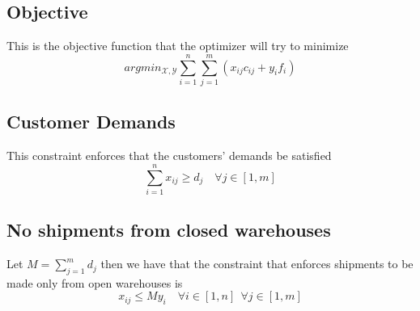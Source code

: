 \documentclass{assignment}
\begin{document}
\subsection{Objective}
This is the objective function that the optimizer will try to minimize
$$ argmin_{\mathcal{X},\mathcal{Y}} \sum_{i=1}^n \sum_{j=1}^m \left( x_{ij}c_{ij} + y_if_i \right) $$

\subsection{Customer Demands}
This constraint enforces that the customers' demands be satisfied
$$\sum_{i=1}^n x_{ij} \geq d_j \quad \forall j \in [1,m] $$

\subsection{No shipments from closed warehouses}
Let $M = \sum_{j=1}^m d_j$ then we have that the constraint that enforces shipments to be made only from open warehouses is
$$ x_{ij} \leq My_i \quad \forall i \in [1,n] \;\,\forall j \in [1,m] $$
\end{document}
